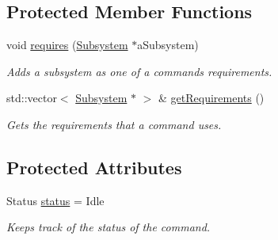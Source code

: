 \subsection*{Protected Member Functions}
\begin{DoxyCompactItemize}
\item 
void \mbox{\hyperlink{classlib_iterative_robot_1_1_command_ad7b7f328974f5f17a2a4b1593b6c9eb5}{requires}} (\mbox{\hyperlink{classlib_iterative_robot_1_1_subsystem}{Subsystem}} $\ast$a\+Subsystem)
\begin{DoxyCompactList}\small\item\em Adds a subsystem as one of a command\textquotesingle{}s requirements. \end{DoxyCompactList}\item 
std\+::vector$<$ \mbox{\hyperlink{classlib_iterative_robot_1_1_subsystem}{Subsystem}} $\ast$ $>$ \& \mbox{\hyperlink{classlib_iterative_robot_1_1_command_a447ba6e394f165c6d358471a8bbdc76a}{get\+Requirements}} ()
\begin{DoxyCompactList}\small\item\em Gets the requirements that a command uses. \end{DoxyCompactList}\end{DoxyCompactItemize}
\subsection*{Protected Attributes}
\begin{DoxyCompactItemize}
\item 
\mbox{\label{classlib_iterative_robot_1_1_command_a54548a957a6b4097837c41fcc660467e}} 
Status \mbox{\hyperlink{classlib_iterative_robot_1_1_command_a54548a957a6b4097837c41fcc660467e}{status}} = Idle
\begin{DoxyCompactList}\small\item\em Keeps track of the status of the command. \end{DoxyCompactList}\end{DoxyCompactItemize}
